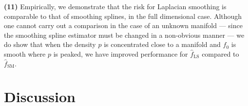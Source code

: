 \documentclass{article}
\newcommand{\1}{\mathbf{1}}
\newcommand{\wh}[1]{\widehat{#1}}
\newcommand{\LS}{\mathrm{LS}}
\theoremstyle{alden}
\theoremstyle{aldenthm}
\theoremstyle{definition}
\theoremstyle{remark}
\begin{document}
\quad \textbf{(11)} Empirically, we demonstrate that the risk for Laplacian smoothing is comparable to that of smoothing splines, in the full dimensional case. Although one cannot carry out a comparison in the case of an unknown manifold --- since the smoothing spline estimator must be changed in a non-obvious manner --- we do show that when the density $p$ is concentrated close to a manifold and $f_0$ is smooth where $p$ is peaked, we have improved performance for $\wh{f}_{\LS}$ compared to $\wh{f}_{\mathrm{SM}}$. 

\section{Discussion}

\clearpage


 
\end{document}
